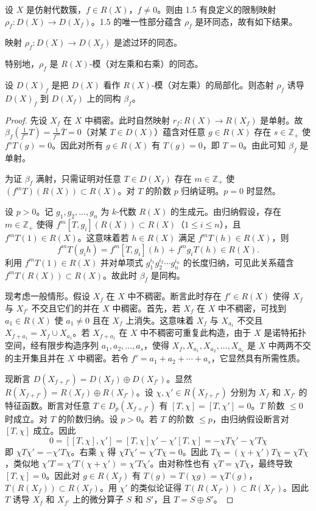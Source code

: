 设 $X$ 是仿射代数簇，$f\in R(X)$，$f\neq 0$。则由 1.5 有良定义的限制映射 $\rho_f:D(X)\to D(X_f)$。1.5 的唯一性部分蕴含 $\rho_f$ 是环同态，故有如下结果。

\begin{proposition}
映射 $\rho_f:D(X)\to D(X_f)$ 是滤过环的同态。
\end{proposition}

特别地，$\rho_f$ 是 $R(X)$-模（对左乘和右乘）的同态。

\begin{lemma}
设 $D(X)_f$ 是把 $D(X)$ 看作 $R(X)$-模（对左乘）的局部化。则态射 $\rho_f$ 诱导 $D(X)_f$ 到 $D(X_f)$ 上的同构 $\beta_f$。
\end{lemma}

\begin{proof}
先设 $X_f$ 在 $X$ 中稠密。此时自然映射 $r_f:R(X)\to R(X_f)$ 是单射。故 $\beta_f(\frac{1}{f^m}T)=\frac{1}{f^m}\bar T=0$（对某 $T\in D(X)$）蕴含对任意 $g\in R(X)$ 存在 $s\in\mathbb{Z}_+$ 使 $f^sT(g)=0$。因此对所有 $g\in R(X)$ 有 $T(g)=0$，即 $T=0$。由此可知 $\beta_f$ 是单射。

为证 $\beta_f$ 满射，只需证明对任意 $T\in D(X_f)$ 存在 $m\in\mathbb{Z}_+$ 使 $(f^mT)(R(X))\subset R(X)$。对 $T$ 的阶数 $p$ 归纳证明。$p=0$ 时显然。

设 $p>0$。记 $g_1,g_2,\dots,g_n$ 为 $k$-代数 $R(X)$ 的生成元。由归纳假设，存在 $m\in\mathbb{Z}_+$ 使得 $f^m[T,g_i](R(X))\subset R(X)$（$1\le i\le n$），且 $f^mT(1)\in R(X)$。这意味着若 $h\in R(X)$ 满足 $f^mT(h)\in R(X)$，则
$$f^mT(g_ih)=f^m[T,g_i](h)+f^m g_iT(h)\in R(X).$$
利用 $f^mT(1)\in R(X)$ 并对单项式 $g_1^{i_1}g_2^{i_2}\cdots g_n^{i_n}$ 的长度归纳，可见此关系蕴含 $f^mT(R(X))\subset R(X)$。故此时 $\beta_f$ 是同构。

现考虑一般情形。假设 $X_f$ 在 $X$ 中不稠密。断言此时存在 $f'\in R(X)$ 使得 $X_f$ 与 $X_{f'}$ 不交且它们的并在 $X$ 中稠密。首先，若 $X_f$ 在 $X$ 中不稠密，可找到 $a_1\in R(X)$ 使 $a_1\neq 0$ 且在 $X_f$ 上消失。这意味着 $X_f$ 与 $X_{a_1}$ 不交且 $X_{f+a_1}=X_f\cup X_{a_1}$。若 $X_{f+a_1}$ 在 $X$ 中不稠密可重复此构造，由于 $X$ 是诺特拓扑空间，经有限步构造序列 $a_1,a_2,\dots,a_s$，使得 $X_f,X_{a_1},X_{a_2},\dots,X_{a_s}$ 是 $X$ 中两两不交的主开集且并在 $X$ 中稠密。若令 $f'=a_1+a_2+\cdots+a_s$，它显然具有所需性质。

现断言 $D(X_{f+f'})=D(X_f)\oplus D(X_{f'})$。显然 $R(X_{f+f'})=R(X_f)\oplus R(X_{f'})$。设 $\chi,\chi'\in R(X_{f+f'})$ 分别为 $X_f$ 和 $X_{f'}$ 的特征函数。断言对任意 $T\in D_p(X_{f+f'})$ 有 $[T,\chi]=[T,\chi']=0$。$T$ 阶数 $\le 0$ 时成立。对 $T$ 的阶数归纳。设 $p>0$。若 $T$ 的阶数 $\le p$，由归纳假设断言对 $[T,\chi]$ 成立。因此
$$0=[[T,\chi],\chi']=[T,\chi]\chi'-\chi'[T,\chi]=-\chi T\chi'-\chi'T\chi$$
即 $\chi T\chi'=-\chi'T\chi$。右乘 $\chi$ 得 $\chi T\chi'=\chi'T\chi=0$。因此 $T\chi=(\chi+\chi')T\chi=\chi T\chi$，类似地 $\chi'T=\chi'T(\chi+\chi')=\chi'T\chi'$。由对称性也有 $\chi T=\chi T\chi$，最终导致 $[T,\chi]=0$。因此对 $g\in R(X_f)$ 有 $T(g)=T(\chi g)=\chi T(g)$，$T(R(X_f))\subset R(X_f)$。用 $\chi'$ 的类似论证得 $T(R(X_{f'}))\subset R(X_{f'})$。因此 $T$ 诱导 $X_f$ 和 $X_{f'}$ 上的微分算子 $S$ 和 $S'$，且 $T=S\oplus S'$。


\end{proof}
